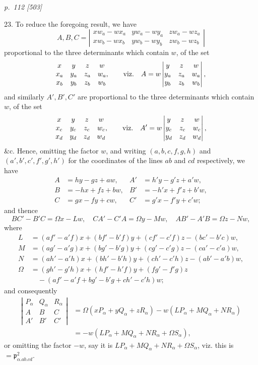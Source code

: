 \documentclass[11pt,a4paper]{article}
\newcommand{\sourcepage}[2]{%
  \bigskip
  \noindent\textit{p.~#1 [#2]}%
  \par\smallskip
}
\newcommand{\Det}[1]{\left|\begin{matrix}#1\end{matrix}\right|}
\newcommand{\surf}[1]{\par\smallskip\noindent{\itshape \{Surface $#1$.\}}\par\smallskip}
\newcommand{\p}{\mathfrak p}
\begin{document}
\sourcepage{112}{503}
23. To reduce the foregoing result, we have
\[
A,B,C=
\Det{xw_a-wx_a&yw_a-wy_a&zw_a-wz_a\\
xw_b-wx_b&yw_b-wy_b&zw_b-wz_b}
\]
proportional to the three determinants which contain $w$, of the set
\[
\begin{matrix}
x&y&z&w\\
x_a&y_a&z_a&w_a\\
x_b&y_b&z_b&w_b
\end{matrix},
\qquad
\hbox{viz.}\quad
A=w\Det{y&z&w\\y_a&z_a&w_a\\y_b&z_b&w_b},
\]
and similarly $A',B',C'$ are proportional to the three determinants which contain
$w$, of the set
\[
\begin{matrix}
x&y&z&w\\
x_c&y_c&z_c&w_c\\
x_d&y_d&z_d&w_d
\end{matrix},
\qquad
\hbox{viz.}\quad
A'=w\Det{y&z&w\\y_c&z_c&w_c\\y_d&z_d&w_d},
\]
\&c. Hence, omitting the factor $w$, and writing $(a,b,c,f,g,h)$ and
$(a',b',c',f',g',h')$ for the coordinates of the lines $ab$ and $cd$ respectively,
we have
\[
\begin{aligned}
A&=hy-gz+aw,& A'&=h'y-g'z+a'w,\\
B&=-hx+fz+bw,& B'&=-h'x+f'z+b'w,\\
C&=gx-fy+cw,& C'&=g'x-f'y+c'w;
\end{aligned}
\]
and thence
\[
BC'-B'C=\Omega x-Lw,\quad CA'-C'A=\Omega y-Mw,\quad AB'-A'B=\Omega z-Nw,
\]
where
\[
\begin{aligned}
L&=(af'-a'f)x+(bf'-b'f)y+(cf'-c'f)z-(bc'-b'c)w,\\
M&=(ag'-a'g)x+(bg'-b'g)y+(cg'-c'g)z-(ca'-c'a)w,\\
N&=(ah'-a'h)x+(bh'-b'h)y+(ch'-c'h)z-(ab'-a'b)w,\\
\Omega&=(gh'-g'h)x+(hf'-h'f)y+(fg'-f'g)z\\
&\quad-(af'-a'f+bg'-b'g+ch'-c'h)w;
\end{aligned}
\]
and consequently
\[
\begin{aligned}
\Det{P_\alpha&Q_\alpha&R_\alpha\\A&B&C\\A'&B'&C'}
&=\Omega(xP_\alpha+yQ_\alpha+zR_\alpha)
-w(LP_\alpha+MQ_\alpha+NR_\alpha)\\
&=-w(LP_\alpha+MQ_\alpha+NR_\alpha+\Omega S_\alpha),
\end{aligned}
\]
or omitting the factor $-w$, say it is
$LP_\alpha+MQ_\alpha+NR_\alpha+\Omega S_\alpha$, viz. this is
$=\p^2_{\alpha.ab.cd}$.
\surf{abcde\alpha}
\end{document}
